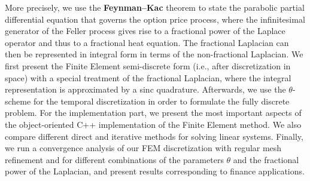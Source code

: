 More precisely, we use the \textbf{Feynman--Kac} theorem to state 
the parabolic partial differential equation that governs the option price process, 
where the infinitesimal generator of the Feller process gives rise 
to a fractional power of the Laplace operator 
and thus to a fractional heat equation. 
The fractional Laplacian can then be represented in integral form 
in terms of the non-fractional Laplacian\cite{pazi}. 
We first present the Finite Element semi-discrete form 
(i.e., after discretization in space) 
with a special treatment of the fractional Laplacian, where the integral representation is approximated by a sinc quadrature\cite{Bonito}.
Afterwards, we use the $\theta$-scheme for 
the temporal discretization in order to formulate the fully discrete problem. 
For the implementation part, we present the most important aspects of the object-oriented
C++ implementation of the Finite Element method. We also compare different direct and iterative methods for solving linear systems. Finally, we run a convergence analysis of our FEM discretization 
with regular mesh refinement and for different combinations of the parameters $\theta$ 
and the fractional power of the Laplacian, and present results corresponding to finance applications.
